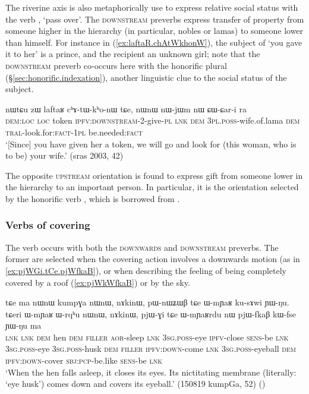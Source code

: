 The riverine axis is also metaphorically use to express relative social status with the verb , `pass over'. The \textsc{downstream} preverbs express transfer of property from someone higher in the hierarchy (in particular, nobles or lamas) to someone lower than himself. For instance in (\ref{ex:laftaR.chAtWkhonW}), the subject of  `you gave it to her' is a prince, and the recipient an unknown girl; note that the \textsc{downstream} preverb co-occurs here with the honorific plural (§\ref{sec:honorific.indexation}), another linguistic clue to the social status of the subject.

\begin{exe}
\ex \label{ex:laftaR.chAtWkhonW}
\gll nɯtɕu zɯ laftaʁ cʰɤ-tɯ-kʰo-nɯ tɕe, nɯnɯ nɯ-jɯm nɯ ɕɯ-ɕar-i ra \\
\textsc{dem}:\textsc{loc} \textsc{loc} token \textsc{ipfv}:\textsc{downstream}-2-give-\textsc{pl} \textsc{lnk} \textsc{dem} \textsc{3pl}.\textsc{poss}-wife.of.lama \textsc{dem} \textsc{tral}-look.for:\textsc{fact}-\textsc{1pl} be.needed:\textsc{fact} \\
\glt `[Since] you have given her a token, we will go and look for (this woman, who is to be) your wife.' (sras 2003, 42)
\end{exe}

The opposite \textsc{upstream} orientation is found to express gift from someone lower in the hierarchy to an important person. In particular, it is the orientation selected by the honorific verb , which is borrowed from .
 
\subsubsection{Verbs of covering} \label{sec:preverb.cover}
The verb  occurs with both the \textsc{downwards} and \textsc{downstream} preverbs. The former are selected when the covering action involves a downwards motion (as in \ref{ex:pjWGi.tCe.pjWfkaB}), or when describing the feeling of being completely covered by a roof (\ref{ex:pjWkWfkaB}) or by the sky.

\begin{exe}
\ex \label{ex:pjWGi.tCe.pjWfkaB}
\gll  tɕe ma nɯnɯ kumpɣa nɯnɯ, nɤkinɯ, pɯ-nɯʑɯβ tɕe ɯ-mɲaʁ ku-sɤwi ɲɯ-ŋu. tɕeri ɯ-mɲaʁ ɯ-rqʰu nɯnɯ, nɤkinɯ, pjɯ-ɣi tɕe ɯ-mɲaʁrdu nɯ pjɯ-fkaβ kɯ-fse ɲɯ-ŋu ma \\
\textsc{lnk} \textsc{lnk} \textsc{dem} hen \textsc{dem} \textsc{filler} \textsc{aor}-sleep \textsc{lnk} \textsc{3sg}.\textsc{poss}-eye \textsc{ipfv}-close \textsc{sens}-be \textsc{lnk} \textsc{3sg}.\textsc{poss}-eye \textsc{3sg}.\textsc{poss}-husk \textsc{dem} \textsc{filler} \textsc{ipfv}:\textsc{down}-come \textsc{lnk} \textsc{3sg}.\textsc{poss}-eyeball \textsc{dem} \textsc{ipfv}:\textsc{down}-cover \textsc{sbj}:\textsc{pcp}-be.like \textsc{sens}-be \textsc{lnk} \\
\glt `When the hen falls asleep, it closes its eyes. Its nictitating membrane (literally: `eye husk') comes down and covers its eyeball.' (150819 kumpGa, 52) ()
\end{exe}

